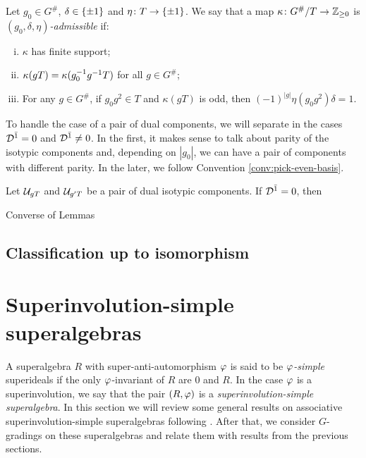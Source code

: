 \begin{defi}
    Let $g_0 \in G^\#$, $\delta \in \{ \pm 1 \}$ and $\eta\colon T \to \{ \pm 1 \}$. 
    We say that a map $\kappa\colon G^\#/T \to \mathbb{Z}_{\geq 0}$ is \emph{$(g_0, \delta, \eta)$-admissible} if:
    \begin{enumerate}[(i)]
        \item $\kappa$ has finite support; \label{item:kappa-finite-support}
        \item $\kappa(gT) = \kappa(g_0^{-1} g^{-1} T)$ for all $g\in G^\#$; \label{item:kappa-duality}
        \item For any $g\in G^\#$, if $g_0 g^2 \in T$ and $\kappa (gT)$ is odd, then $(-1)^{|g|} \eta (g_0 g^2) \delta = 1$. \label{item:kappa-parity}
    \end{enumerate}
\end{defi}

To handle the case of a pair of dual components, we will separate in the cases $\mathcal{D}^{\bar1} = 0$ and $\mathcal{D}^{\bar1} \neq 0$. 
In the first, it makes sense to talk about parity of the isotypic components and, depending on $|g_0|$, we can have a pair of components with different parity. 
In the later, we follow Convention \ref{conv:pick-even-basis}.  

\begin{lemma}
    Let $\mathcal U_{gT}$ and $\mathcal U_{g'T}$ be a pair of dual isotypic components. 
    If $\mathcal{D}^{\bar1} = 0$, then 
\end{lemma}

\begin{prop}
    Converse of Lemmas
\end{prop}

\subsection{Classification up to isomorphism}


\section{Superinvolution-simple superalgebras}

A superalgebra $R$ with super-anti-automorphism $\varphi$ is said to be \emph{$\varphi$-simple} %
superideals if the only $\varphi$-invariant of $R$ are $0$ and $R$. 
In the case $\varphi$ is a superinvolution, we say that the pair $(R, \varphi)$ is a \emph{superinvolution-simple superalgebra}.
In this section we will review some general results on associative superinvolution-simple superalgebras following \cite{racine}. 
After that, we consider $G$-gradings on these superalgebras and relate them with results from the previous sections.

